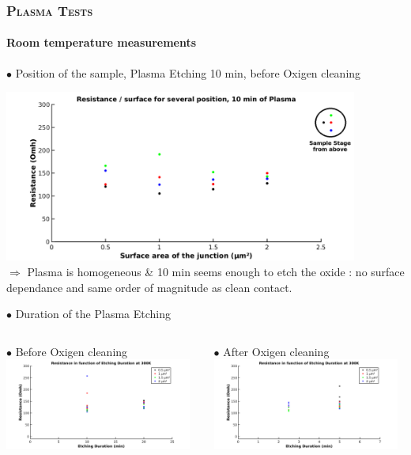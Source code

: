 \documentclass[handout]{beamer}
\begin{document}
    \begin{frame}[allowframebreaks]
        \frametitle{\textsc{Plasma Tests}}
        \framesubtitle{Room temperature measurements}
        
        $\bullet$  Position of the sample, Plasma Etching 10 min, before Oxigen cleaning
        \vspace{0.3cm}
               
        \includegraphics[width=330pt]{R_Position.png}\\
        $\Rightarrow$ Plasma is homogeneous \& 10 min seems enough to etch the oxide : no surface dependance and same order of magnitude as clean contact.
        \vspace{0.5cm}
        
        $\bullet$ Duration of the Plasma Etching
        \vspace{0.3cm}
        
        \begin{columns}[onlytextwidth]
            \begin{column}{0.5\textwidth}
                \hspace{0.5cm} $\bullet$ Before Oxigen cleaning\\
                \includegraphics[width=174pt]{R_TimeBefore.png}
            \end{column}
            \begin{column}{0.5\textwidth}
                \hspace{0.5cm} $\bullet$ After Oxigen cleaning\\
                \includegraphics[width=174pt]{R_TimeAfter.png}
            \end{column}
        \end{columns}
        

\end{frame}
\end{document}
